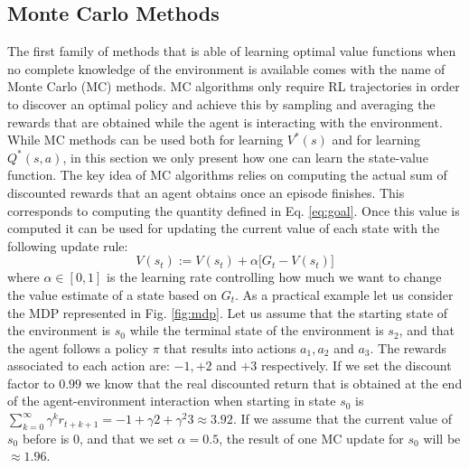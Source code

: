 \subsection{Monte Carlo Methods}
The first family of methods that is able of learning optimal value functions when no complete knowledge of the environment is available comes with the name of Monte Carlo (MC) methods. MC algorithms only require RL trajectories in order to discover an optimal policy and achieve this by sampling and averaging the rewards that are obtained while the agent is interacting with the environment. While MC methods can be used both for learning $V^{*}(s)$ and for learning $Q^{*}(s,a)$, in this section we only present how one can learn the state-value function. The key idea of MC algorithms relies on computing the actual sum of discounted rewards that an agent obtains once an episode finishes. This corresponds to computing the quantity defined in Eq. \ref{eq:goal}. Once this value is computed it can be used for updating the current value of each state with the following update rule: 
\begin{equation}
	V(s_t) := V(s_t) + \alpha \big[G_t - V(s_t) \big]
\label{eq:mc_update}
\end{equation}
where $\alpha \in [0,1]$ is the learning rate controlling how much we want to change the value estimate of a state based on $G_t$. As a practical example let us consider the MDP represented in Fig. \ref{fig:mdp}. Let us assume that the starting state of the environment is $s_0$ while the terminal state of the environment is $s_2$, and that the agent follows a policy $\pi$ that results into actions $a_1, a_2$ and $a_3$. The rewards associated to each action are: $-1, +2$ and $+3$ respectively. If we set the discount factor to $0.99$ we know that the real discounted return that is obtained at the end of the agent-environment interaction when starting in state $s_0$ is $\sum_{k=0}^{\infty}\gamma^{k} r_{t+k+1} = -1+\gamma2+\gamma^{2}3 \approx 3.92$. If we assume that the current value of $s_0$ before is $0$, and that we set $\alpha=0.5$, the result of one MC update for $s_0$ will be $\approx 1.96$. 

